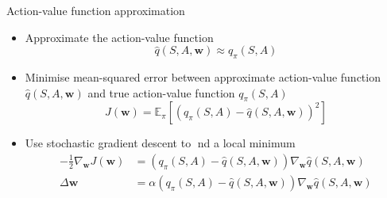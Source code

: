 \bgroup
\begin{frame}{Action-value function approximation}
\begin{itemize}
\item Approximate the action-value function
\begin{equation*}
\hat{q}(S,A,\textbf{w})\approx q_{\pi}(S,A)
\end{equation*}
%
\item Minimise mean-squared error between approximate
action-value function $\hat{q}(S,A,\textbf{w})$ and true action-value function $q_{\pi}(S, A)$
\begin{equation*}
J(\textbf{w})=\mathbb{E}_{\pi}[(q_{\pi}(S, A)-\hat{q}(S,A,\textbf{w}))^2]
\end{equation*}
%
\item Use stochastic gradient descent to nd a local minimum
\begin{align*}
-\frac{1}{2}\nabla_{\textbf{w}}J(\textbf{w})&=(q_{\pi}(S, A)-\hat{q}(S,A,\textbf{w}))\nabla_{\textbf{w}}\hat{q}(S,A,\textbf{w})\\
\Delta \textbf{w} &= \alpha(q_{\pi}(S, A)-\hat{q}(S,A,\textbf{w}))\nabla_{\textbf{w}}\hat{q}(S,A,\textbf{w})
\end{align*}
%
\end{itemize}
\end{frame}
\egroup